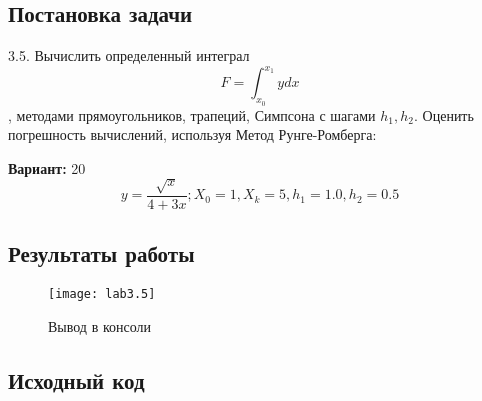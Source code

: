\subsection{Постановка задачи}
3.5. Вычислить определенный интеграл $$F = \int_{x_0}^{x_1}ydx$$, 
методами прямоугольников, трапеций, Симпсона с шагами $h_1, h_2$. Оценить погрешность вычислений, используя  Ме­тод Рунге-Ромберга: 

{\bfseries Вариант:} 20
    \begin{equation}
		y = \frac{\sqrt{x}}{4+3x}; X_0 =1 , X_k =5, h_1 = 1.0, h_2 = 0.5
    \end{equation}
\pagebreak

\subsection{Результаты работы}
\begin{figure}[h!]
\centering
\texttt{[image: lab3.5]}
\caption{Вывод в консоли}
\end{figure}


\subsection{Исходный код}

\pagebreak